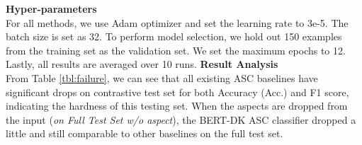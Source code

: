 \textbf{Hyper-parameters}\\
For all methods, we use Adam optimizer and set the learning rate to 3e-5. The batch size is set as 32.
To perform model selection, we hold out 150 examples from the training set as the validation set.
We set the maximum epochs to 12.
Lastly, all results are averaged over 10 runs.
\textbf{Result Analysis}\\
From Table \ref{tbl:failure}, %
we can see that all existing ASC baselines have significant drops on contrastive test set for both Accuracy (Acc.) and F1 score, indicating the hardness of this testing set.
When the aspects are dropped from the input (\emph{on Full Test Set w/o aspect}), the BERT-DK ASC classifier dropped a little and still comparable to other baselines on the full test set.

